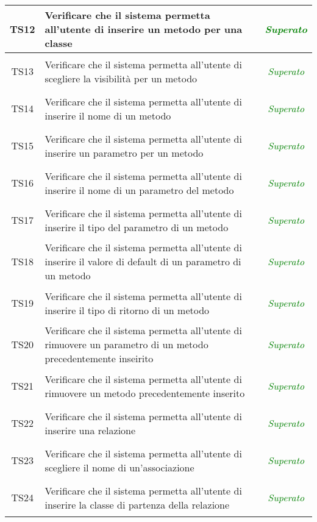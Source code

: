 \begin{longtable}{|c|>{}m{8cm}|c|}
\hypertarget{TS12}{TS12} & Verificare che il sistema permetta all'utente di inserire un metodo per una classe & \textcolor{Green}{\textit{Superato}}\\ \hline
\hypertarget{TS13}{TS13} & Verificare che il sistema permetta all'utente di scegliere la visibilità per un metodo & \textcolor{Green}{\textit{Superato}}\\ \hline
\hypertarget{TS14}{TS14} & Verificare che il sistema permetta all'utente di inserire il nome di un metodo & \textcolor{Green}{\textit{Superato}}\\ \hline
\hypertarget{TS15}{TS15} & Verificare che il sistema permetta all'utente di inserire un parametro per un metodo & \textcolor{Green}{\textit{Superato}}\\ \hline
\hypertarget{TS16}{TS16} & Verificare che il sistema permetta all'utente di inserire il nome di un parametro del metodo & \textcolor{Green}{\textit{Superato}}\\ \hline
\hypertarget{TS17}{TS17} & Verificare che il sistema permetta all'utente di inserire il tipo del parametro di un metodo & \textcolor{Green}{\textit{Superato}}\\ \hline
\hypertarget{TS18}{TS18} & Verificare che il sistema permetta all'utente di inserire il valore di default di un parametro di un metodo & \textcolor{Green}{\textit{Superato}}\\ \hline
\hypertarget{TS19}{TS19} & Verificare che il sistema permetta all'utente di inserire il tipo di ritorno di un metodo & \textcolor{Green}{\textit{Superato}}\\ \hline
\hypertarget{TS20}{TS20} & Verificare che il sistema permetta all'utente di rimuovere un parametro di un metodo precedentemente inseirito & \textcolor{Green}{\textit{Superato}}\\ \hline
\hypertarget{TS21}{TS21} & Verificare che il sistema permetta all'utente di rimuovere un metodo precedentemente inserito & \textcolor{Green}{\textit{Superato}}\\ \hline
\hypertarget{TS22}{TS22} & Verificare che il sistema permetta all'utente di inserire una relazione & \textcolor{Green}{\textit{Superato}}\\ \hline
\hypertarget{TS23}{TS23} & Verificare che il sistema permetta all'utente di scegliere il nome di un'associazione & \textcolor{Green}{\textit{Superato}}\\ \hline
\hypertarget{TS24}{TS24} & Verificare che il sistema permetta all'utente di inserire la classe di partenza della relazione & \textcolor{Green}{\textit{Superato}}\\ \hline

\end{longtable}
